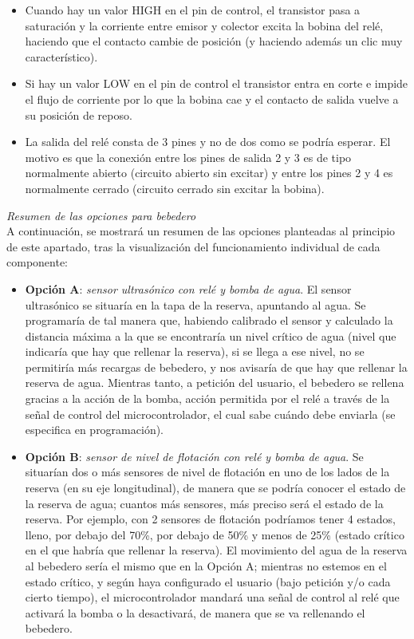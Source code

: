 \documentclass[12pt]{article}
\begin{document}
	\begin{itemize}
		\item Cuando hay un valor HIGH en el pin de control,  el transistor pasa a saturación  y la corriente entre emisor y colector excita la bobina del relé, haciendo que el contacto cambie de posición (y haciendo además un clic muy característico).
		
		\item Si hay un valor LOW en el pin de control el transistor entra en corte e impide el flujo de corriente por lo que la bobina cae y el contacto de salida vuelve a su posición de reposo.
		
		\item La salida del relé consta de 3 pines y no de dos como se podría esperar.  El motivo es que la conexión entre los pines de salida 2 y 3 es de tipo normalmente abierto (circuito abierto sin excitar) y entre los pines 2 y 4 es normalmente cerrado (circuito cerrado sin excitar la bobina).

	\end{itemize}
	
	\noindent \textit{Resumen de las opciones para bebedero}
	 \\
	 
	 \noindent A continuación, se mostrará un resumen de las opciones planteadas al principio de este apartado, tras la visualización del funcionamiento individual de cada componente:
	 
	 \begin{itemize}
	 	\item \textbf{Opción A}: \textit{sensor ultrasónico con relé y bomba de agua}. El sensor ultrasónico se situaría en la tapa de la reserva, apuntando al agua. Se programaría de tal manera que, habiendo calibrado el sensor y calculado la distancia máxima a la que se encontraría un nivel crítico de agua (nivel que indicaría que hay que rellenar la reserva), si se llega a ese nivel, no se permitiría más recargas de bebedero, y nos avisaría de que hay que rellenar la reserva de agua. Mientras tanto, a petición del usuario, el bebedero se rellena gracias a la acción de la bomba, acción permitida por el relé a través de la señal de control del microcontrolador, el cual sabe cuándo debe enviarla (se especifica en programación).
	 	\item \textbf{Opción B}: \textit{sensor de nivel de flotación con relé y bomba de agua}. Se situarían dos o más sensores de nivel de flotación en uno de los lados de la reserva (en su eje longitudinal), de manera que se podría conocer el estado de la reserva de agua; cuantos más sensores, más preciso será el estado de la reserva. Por ejemplo, con 2 sensores de flotación podríamos tener 4 estados, lleno, por debajo del 70\%, por debajo de 50\% y menos de 25\% (estado crítico en el que habría que rellenar la reserva). El movimiento del agua de la reserva al bebedero sería el mismo que en la Opción A; mientras no estemos en el estado crítico, y según haya configurado el usuario (bajo petición y/o cada cierto tiempo), el microcontrolador mandará una señal de control al relé que activará la bomba o la desactivará, de manera que se va rellenando el bebedero.
	 \end{itemize}
	
\end{document}

